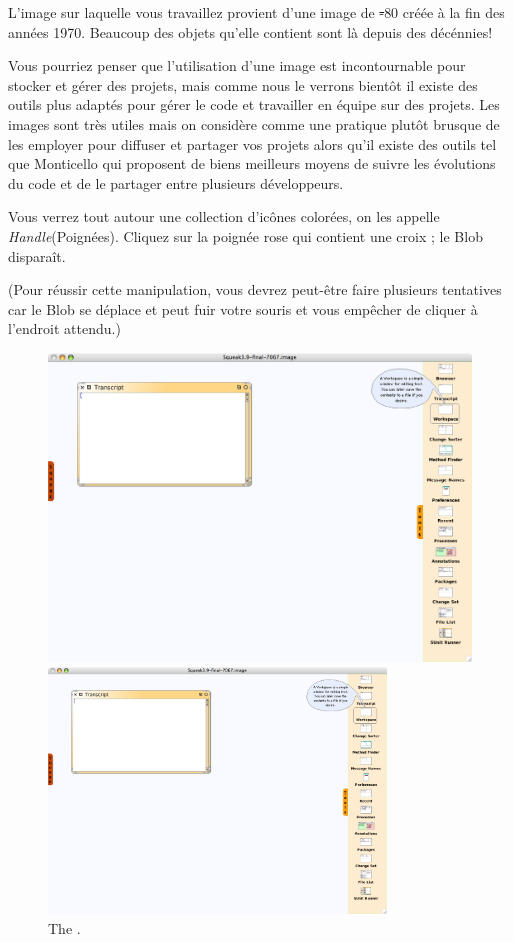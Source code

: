 \documentclass[a4paper,10pt,twoside]{book}
\begin{document}
L'image sur laquelle vous travaillez provient d'une image de \st-80 créée à la fin des années 1970.
Beaucoup des objets qu'elle contient sont là depuis des décénnies!

Vous pourriez penser que l'utilisation d'une image est incontournable pour stocker et gérer des projets, mais comme nous le verrons bientôt il existe des outils plus adaptés pour gérer le code et travailler en équipe sur des projets.
Les images sont très utiles mais on considère comme une pratique plutôt brusque de les employer pour diffuser et partager vos projets alors qu'il existe des outils tel que Monticello qui proposent de biens meilleurs moyens de suivre les évolutions du code et de le partager entre plusieurs développeurs.



Vous verrez tout autour une collection d'icônes colorées, on les appelle \emph{Handle}(Poignées).  
Cliquez sur la poignée rose qui contient une croix ; le Blob disparaît.

(Pour réussir cette manipulation, vous devrez peut-être faire plusieurs tentatives car le Blob se déplace et peut fuir votre souris et vous empêcher de cliquer à l'endroit attendu.)


\begin{figure}[htb]
\ifluluelse
	{\centerline {\includegraphics[width=\textwidth]{Tools}}}
	{\centerline {\includegraphics[width=0.8\textwidth]{Tools}}}
\caption{The \sq \toolsflap.\label{fig:tools}}
\end{figure}
\end{document}
